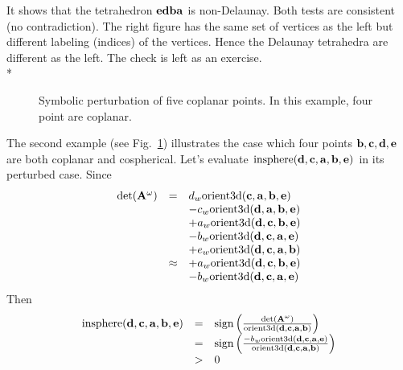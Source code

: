It shows that the tetrahedron ${\bf edba}$ is non-Delaunay. Both tests are consistent (no contradiction).  The right figure has the same set of vertices as the left but different labeling (indices) of the vertices. Hence the Delaunay tetrahedra are different as the left. The check is left as an exercise.\\*

\begin{figure}
\caption{Symbolic perturbation of five coplanar points. In this example, four point are coplanar.}
\label{fig:ex2}
\end{figure}

The second example (see Fig.~\ref{fig:ex2}) illustrates the case which four points ${\bf b}, {\bf c}, {\bf d}, {\bf e}$ are both coplanar and cospherical. Let's evaluate $\textrm{insphere}({\bf d},{\bf c},{\bf a},{\bf b},{\bf e})$ in its perturbed case. Since
\[
\begin{array}{rcl}
\textrm{det}({\bf A}^{\omega}) &=&
d_w\textrm{orient3d}({\bf c},{\bf a},{\bf b},{\bf e})\\
& & -c_w\textrm{orient3d}({\bf d},{\bf a},{\bf b},{\bf e})\\
& & +a_w\textrm{orient3d}({\bf d},{\bf c},{\bf b},{\bf e})\\
& & -b_w\textrm{orient3d}({\bf d},{\bf c},{\bf a},{\bf e})\\
& & +e_w\textrm{orient3d}({\bf d},{\bf c},{\bf a},{\bf b})\\
&\approx& +a_w\textrm{orient3d}({\bf d},{\bf c},{\bf b},{\bf e})\\
& & -b_w\textrm{orient3d}({\bf d},{\bf c},{\bf a},{\bf e})
\end{array}
\]
Then
\[
\begin{array}{rcl}
\textrm{insphere}({\bf d},{\bf c},{\bf a},{\bf b},{\bf e}) &=&
\textrm{sign}\left(\frac{\textrm{det}({\bf A}^{\omega})}{\textrm{orient3d}({\bf d},{\bf c},{\bf a},{\bf b})}\right)\\
&=& \textrm{sign}\left(\frac{-b_w\textrm{orient3d}({\bf d},{\bf c},{\bf a},{\bf e})}{\textrm{orient3d}({\bf d},{\bf c},{\bf a},{\bf b})}\right)\\
&>& 0
\end{array}
\]

